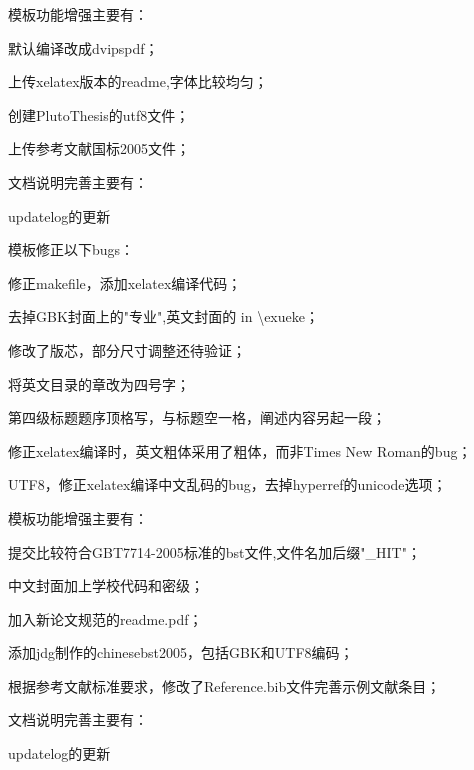 模板功能增强主要有：
\begin{hitlist}
    \item 默认编译改成dvipspdf；
    \item 上传xelatex版本的readme,字体比较均匀；
    \item 创建PlutoThesis的utf8文件；
    \item 上传参考文献国标2005文件；
\end{hitlist}

文档说明完善主要有：
\begin{hitlist}
   \item  updatelog的更新
\end{hitlist}

模板修正以下bugs：
\begin{hitlist}
    \item 修正makefile，添加xelatex编译代码； 
    \item 去掉GBK封面上的"专业",英文封面的 in \textbackslash exueke； 
    \item 修改了版芯，部分尺寸调整还待验证； 
    \item 将英文目录的章改为四号字； 
    \item 第四级标题题序顶格写，与标题空一格，阐述内容另起一段； 
    \item 修正xelatex编译时，英文粗体采用了粗体，而非Times New Roman的bug；
    \item UTF8，修正xelatex编译中文乱码的bug，去掉hyperref的unicode选项； 
\end{hitlist}


模板功能增强主要有：
\begin{hitlist}
    \item 提交比较符合GBT7714-2005标准的bst文件,文件名加后缀"\_HIT"； 
    \item 中文封面加上学校代码和密级； 
    \item 加入新论文规范的readme.pdf；
    \item 添加jdg制作的chinesebst2005，包括GBK和UTF8编码；
    \item 根据参考文献标准要求，修改了Reference.bib文件完善示例文献条目；
\end{hitlist}

文档说明完善主要有：
\begin{hitlist}
   \item  updatelog的更新
\end{hitlist}

